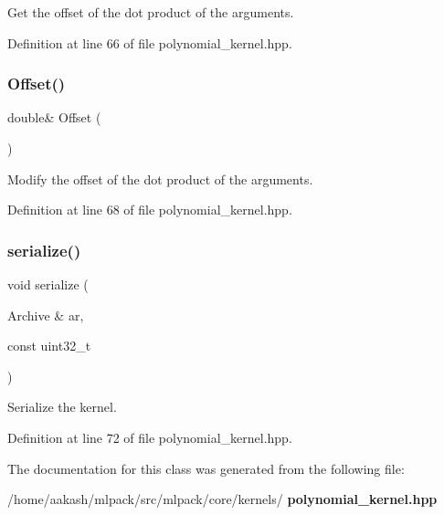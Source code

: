 Get the offset of the dot product of the arguments. 



Definition at line 66 of file polynomial\+\_\+kernel.\+hpp.

\mbox{\label{classmlpack_1_1kernel_1_1PolynomialKernel_a37ef08fdb2295b040e6c3a59cf907249}} 
\subsubsection{Offset()\hspace{0.1cm}{\footnotesize\ttfamily [2/2]}}
{\footnotesize\ttfamily double\& Offset (\begin{DoxyParamCaption}{ }\end{DoxyParamCaption})\hspace{0.3cm}{\ttfamily [inline]}}



Modify the offset of the dot product of the arguments. 



Definition at line 68 of file polynomial\+\_\+kernel.\+hpp.

\mbox{\label{classmlpack_1_1kernel_1_1PolynomialKernel_a65cba07328997659bec80b9879b15a51}} 
\subsubsection{serialize()}
{\footnotesize\ttfamily void serialize (\begin{DoxyParamCaption}\item[{Archive \&}]{ar,  }\item[{const uint32\+\_\+t}]{ }\end{DoxyParamCaption})\hspace{0.3cm}{\ttfamily [inline]}}



Serialize the kernel. 



Definition at line 72 of file polynomial\+\_\+kernel.\+hpp.



The documentation for this class was generated from the following file\+:\begin{DoxyCompactItemize}
\item 
/home/aakash/mlpack/src/mlpack/core/kernels/\textbf{ polynomial\+\_\+kernel.\+hpp}\end{DoxyCompactItemize}
